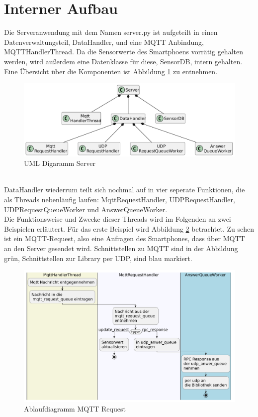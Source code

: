 \documentclass[11pt,a4paper]{report}
\begin{document}
\section{Interner Aufbau}
Die Serveranwendung mit dem Namen server.py ist aufgeteilt in einen Datenverwaltungsteil, DataHandler, und eine MQTT Anbindung, MQTTHandlerThread.
Da die Sensorwerte des Smartphoens vorrätig gehalten werden, wird außerdem eine Datenklasse für diese, SensorDB, intern gehalten.
Eine Übersicht über die Komponenten ist Abbildung \ref{fig:serverUml} zu entnehmen.
\begin{figure}[htbp]
  \centering
  \includegraphics[width=\textwidth]{images/ServerUml}
  \caption{UML Digaramm Server}
  \label{fig:serverUml}
\end{figure}
\\
DataHandler wiederrum teilt sich nochmal auf in vier seperate Funktionen, die als Threads nebenläufig laufen: MqttRequestHandler, UDPRequestHandler, UDPRequestQueueWorker und AnswerQueueWorker.
\\
Die Funktionsweise und Zwecke dieser Threads wird im Folgenden an zwei Beispielen erläutert.
Für das erste Beispiel wird Abbildung \ref{fig:serverMqttReqPath} betrachtet.
Zu sehen ist ein MQTT-Request, also eine Anfragen des Smartphones, dass über MQTT an den Server gesendet wird.
Schnittstellen zu MQTT sind in der Abbildung grün, Schnittstellen zur Library per UDP, sind blau markiert.
\begin{figure}[htbp]
  \centering
  \includegraphics[width=\textwidth]{images/MqttRequestServerPath}
  \caption{Ablaufdiagramm MQTT Request}
  \label{fig:serverMqttReqPath}
\end{figure}
\end{document}
